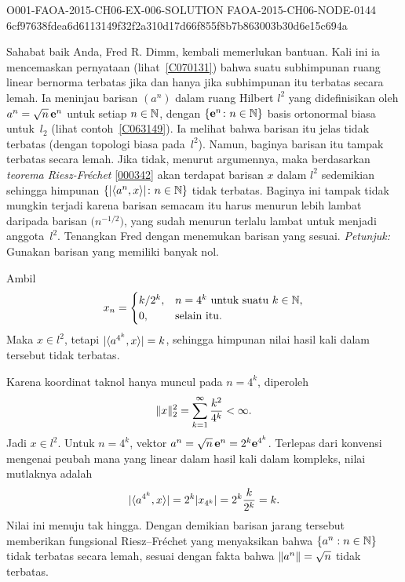 \begin{o001solution}
  {O001-FAOA-2015-CH06-EX-006-SOLUTION}
  {FAOA-2015-CH06-NODE-0144}
  {6cf97638fdea6d6113149f32f2a310d17d66f855f8b7b863003b30d6e15c694a}
\begin{o001statement}
Sahabat baik Anda, Fred R. Dimm, kembali memerlukan bantuan. Kali ini ia mencemaskan
pernyataan (lihat~\ref{C070131}) bahwa suatu subhimpunan ruang linear bernorma terbatas jika
dan hanya jika subhimpunan itu terbatas secara lemah. Ia meninjau barisan $(a^n)$ dalam ruang Hilbert
$l^2$ yang didefinisikan oleh $a^n = \sqrt{n}\,\mathbf{e}^n$ untuk setiap $n \in \mathbb{N}$, dengan $\{\mathbf{e}^n\colon n \in \mathbb{N}\}$ basis ortonormal biasa untuk~$l_2$ (lihat
contoh~\ref{C063149}). Ia melihat bahwa barisan itu jelas tidak terbatas (dengan topologi biasa
pada~$l^2$). Namun, baginya barisan itu tampak terbatas secara lemah. Jika tidak, menurut argumennya, maka
berdasarkan \emph{teorema Riesz-Fr\'echet} \ref{000342} akan terdapat barisan $x$ dalam
$l^2$ sedemikian sehingga himpunan $\{\lvert\langle a^n,x \rangle\rvert\colon n \in\mathbb{N}\}$ tidak terbatas. Baginya ini tampak
tidak mungkin terjadi karena barisan semacam itu harus menurun lebih lambat daripada
barisan $\bigl(n^{-1/2}\bigr)$, yang sudah menurun terlalu lambat untuk menjadi anggota~$l^2$.
Tenangkan Fred dengan menemukan barisan yang sesuai. \emph{Petunjuk:} Gunakan barisan yang
memiliki banyak nol.
\end{o001statement}
\begin{o001answer}
Ambil
\[
 x_n=\begin{cases}
       k/2^k,&n=4^k\text{ untuk suatu }k\in\mathbb{N},\\
       0,&\text{selain itu}.
     \end{cases}
\]
Maka $x\in l^2$, tetapi
$\lvert\langle a^{4^k},x\rangle\rvert=k$, sehingga himpunan nilai hasil kali
dalam tersebut tidak terbatas.
\end{o001answer}
\begin{o001proof}
Karena koordinat taknol hanya muncul pada $n=4^k$, diperoleh
\[
 \lVert x\rVert_2^2=\sum_{k=1}^{\infty}\frac{k^2}{4^k}<\infty.
\]
Jadi $x\in l^2$. Untuk $n=4^k$, vektor
$a^n=\sqrt n\,\mathbf{e}^n=2^k\mathbf{e}^{4^k}$. Terlepas dari konvensi mengenai
peubah mana yang linear dalam hasil kali dalam kompleks, nilai mutlaknya
adalah
\[
 \lvert\langle a^{4^k},x\rangle\rvert
 =2^k\lvert x_{4^k}\rvert=2^k\frac{k}{2^k}=k.
\]
Nilai ini menuju tak hingga. Dengan demikian barisan jarang tersebut
memberikan fungsional Riesz--Fr\'echet yang menyaksikan bahwa
$\{a^n:n\in\mathbb{N}\}$ tidak terbatas secara lemah, sesuai dengan fakta bahwa
$\lVert a^n\rVert=\sqrt n$ tidak terbatas.
\end{o001proof}
\end{o001solution}
